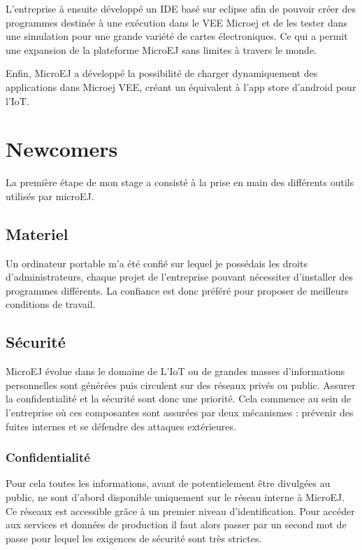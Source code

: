 \documentclass[french,a4paper,12pt]{report}
\begin{document}
L’entreprise à ensuite développé un IDE basé sur eclipse afin de pouvoir créer des programmes destinée à une exécution dans le VEE Microej et de les tester dans une simulation pour une grande variété de cartes électroniques. Ce qui a permit une expansion de la plateforme MicroEJ sans limites à travers le monde.

Enfin, MicroEJ a développé la possibilité de charger dynamiquement des applications dans Microej VEE, créant un équivalent à l'app store d'android pour l'IoT. 

\chapter{Newcomers}

La première étape de mon stage a consisté à la prise en main des différents outils utilisés par microEJ.  

\section{Materiel} 

Un ordinateur portable m’a été confié sur lequel je possédais les droits d’administrateurs, chaque projet de l’entreprise pouvant nécessiter d’installer des programmes différents. La confiance est donc préféré pour proposer de meilleurs conditions de travail.

\section{Sécurité}

MicroEJ évolue dans le domaine de L'IoT ou de grandes masses d'informations personnelles sont générées puis circulent sur des réseaux privés ou public. Assurer la confidentialité et la sécurité sont donc une priorité. Cela commence au sein de l'entreprise où ces composantes sont assurées par deux mécanismes : prévenir des fuites internes et se défendre des attaques extérieures.

\subsection{Confidentialité}

Pour cela toutes les informations, avant de potentielement être divulgées au public, ne sont d'abord disponible uniquement sur le réseau interne à MicroEJ. Ce réseaux est accessible grâce à un premier niveau d'identification. Pour accéder aux services et données de production il faut alors passer par un second mot de passe pour lequel les exigences de sécurité sont très strictes.
\end{document}
